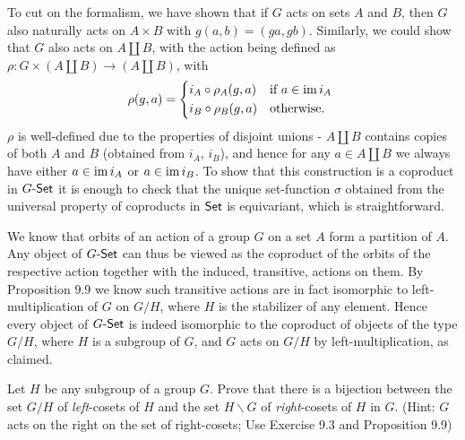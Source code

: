 \begin{solution}
	To cut on the formalism, we have shown that if $G$ acts on sets $A$ and $B$, then $G$ also naturally acts on $A \times B$ with $g(a, b) = (ga, gb)$. Similarly, we could show that $G$ also acts on $A \amalg B$, with the action being defined as $\rho: G \times (A \amalg B) \to (A \amalg B)$, with
	\[
		\rho(g, a) =
		\begin{cases*}
			i_A \circ \rho_A(g, a) & if $a \in \im i_A$ \\
			i_B \circ \rho_B(g, a) & otherwise.
		\end{cases*}
	\]
	$\rho$ is well-defined due to the properties of disjoint unions - $A \amalg B$ contains copies of both $A$ and $B$ (obtained from $i_A$, $i_B$), and hence for any $a \in A \amalg B$ we always have either $a \in \operatorname{im} i_A$ or $a \in \operatorname{im} i_B$. To show that this construction is a coproduct in $G\text{-}\mathsf{Set}$ it is enough to check that the unique set-function $\sigma$ obtained from the universal property of coproducts in $\mathsf{Set}$ is equivariant, which is straightforward.
	
	We know that orbits of an action of a group $G$ on a set $A$ form a partition of $A$. Any object of $G\text{-}\mathsf{Set}$ can thus be viewed as the coproduct of the orbits of the respective action together with the induced, transitive, actions on them. By Proposition 9.9 we know such transitive actions are in fact isomorphic to left-multiplication of $G$ on $G/H$, where $H$ is the stabilizer of any element. Hence every object of $G\text{-}\mathsf{Set}$ is indeed isomorphic to the coproduct of objects of the type $G/H$, where $H$ is a subgroup of $G$, and $G$ acts on $G/H$ by left-multiplication, as claimed.
\end{solution}

\begin{problem}
	Let $H$ be any subgroup of a group $G$. Prove that there is a bijection between the set $G/H$ of \emph{left}-cosets of $H$ and the set $H \backslash G$ of \emph{right}-cosets of $H$ in $G$. (Hint: $G$ acts on the right on the set of right-cosets; Use Exercise 9.3 and Proposition 9.9)
\end{problem}

